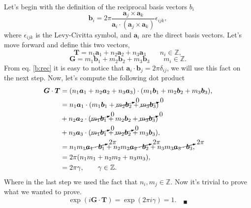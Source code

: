 \begin{questions}
\begin{solution}
  Let's begin with the definition of the reciprocal basis vectors $b_i$
  \begin{equation}
    \bm{b}_i = 2\pi \frac{\bm{a}_j \times \bm{a}_k}{\bm{a}_i\cdot(\bm{a}_j \times \bm{a}_k)}\epsilon_{ijk},
    \label{b:rec}
  \end{equation}
  where $\epsilon_{ijk}$ is the Levy-Civitta symbol, and $\bm{a}_i$ are the direct basis vectors.
  Let's move forward and define this two vectors,
  \begin{equation}
    \bm{T} = n_1\bm{a}_1 + n_2\bm{a}_2 + n_3\bm{a}_3 \qquad n_i\in\mathbb{Z},
    \label{T}
  \end{equation}
  \begin{equation}
    \bm{G} = m_1\bm{b}_1 + m_2\bm{b}_2 + m_3\bm{b}_3 \qquad m_i\in\mathbb{Z}.
    \label{G}
  \end{equation}
  From eq. \ref{b:rec} it is easy to notice that $\bm{a}_i\cdot \bm{b}_j = 2\pi \delta_{ij}$, we will use this fact on the next step. Now, let's compute the following dot product
  \begin{equation}
    \begin{aligned}[b]
      \bm{G}\cdot\bm{T} &= (n_1\bm{a}_1 + n_2\bm{a}_2 + n_3\bm{a}_3)\cdot(m_1\bm{b}_1 + m_2\bm{b}_2 + m_3\bm{b}_3),\\
      &= n_1\bm{a}_1\cdot(m_1\bm{b}_1 + \cancelto{0}{m_2\bm{b}_2} + \cancelto{0}{m_3\bm{b}_3}) \\ &+ n_2\bm{a}_2\cdot(\cancelto{0}{m_1\bm{b}_1} + m_2\bm{b}_2 + \cancelto{0}{m_3\bm{b}_3}) \\ &+ n_3 \bm{a}_3\cdot(\cancelto{0}{m_1\bm{b}_1} + \cancelto{0}{m_2\bm{b}_2} + m_3\bm{b}_3), \\
      &= n_1 m_1\cancelto{2\pi}{\bm{a}_1\cdot\bm{b}_1} + n_2m_2\cancelto{2\pi}{\bm{a}_2\cdot\bm{b}_2} + n_3 m_3 \cancelto{2\pi}{\bm{a}_3\cdot\bm{b}_3}, \\
      &= 2\pi (n_1 m_1 + n_2m_2 + n_3 m_3 ),\\
      &= 2\pi \gamma, \qquad \gamma\in\mathbb{Z}.
    \end{aligned}
    \label{aux}
  \end{equation}
  Where in the last step we used the fact that $n_i,m_j\in\mathbb{Z}$. Now it's trivial to prove what we wanted to prove.
  \begin{equation}
    \exp{(i\bm{G}\cdot\bm{T})} = \exp{(2\pi i\gamma)} = 1.\quad _\blacksquare
  \end{equation}


\end{solution}
\end{questions}
